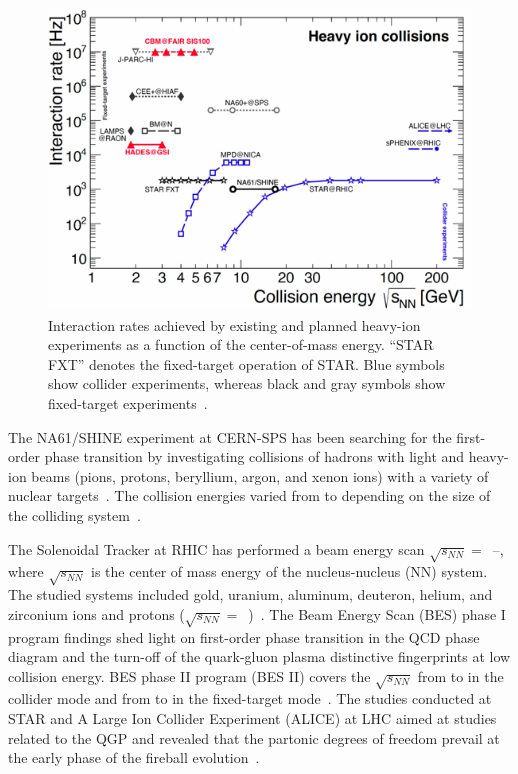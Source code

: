 \begin{figure}[!h]
    \centering
    \includegraphics[width=0.7\columnwidth]{Chapter1/images/interaction_rates.png}
    \caption{Interaction rates achieved by existing and planned heavy-ion experiments as a function of the center-of-mass energy. “STAR FXT” denotes the fixed-target operation of STAR.  Blue symbols show collider experiments, whereas black and gray symbols show fixed-target experiments~\cite{Ablyazimov_2017}.}
    \label{fig:cbm_rates}
\end{figure}

The NA61/SHINE experiment at CERN-SPS has been searching for the first-order phase transition by investigating collisions of hadrons with light and heavy-ion beams (pions, protons, beryllium, argon, and xenon ions) with a variety of nuclear targets~\cite{CBM_physics, Turko:2301677}. The collision energies varied from  to  depending on the size of the colliding system~\cite{na61energy}. 

The Solenoidal Tracker at \gls{RHIC} has
performed a beam energy scan $\sqrt{s_{NN}} =$~--, where $\sqrt{s_{NN}}$ is the center of mass energy of the nucleus-nucleus (NN) system. The studied systems included gold, uranium, aluminum, deuteron, helium, and zirconium ions and protons ($\sqrt{s_{NN}}=$~)~\cite{Stefaniak:2022dxo}. The Beam Energy Scan (\gls{BES}) phase I program findings shed light on first-order phase transition in the QCD phase diagram and the turn-off of the quark-gluon plasma distinctive fingerprints at low collision energy. BES phase II program (BES II) covers the $\sqrt{s_{NN}}$ from  to  in the collider mode and from  to  in the fixed-target mode~\cite{STAR2, STAR1}.
The studies conducted at \gls{STAR} and A Large Ion Collider Experiment (\gls{ALICE}) at \gls{LHC} aimed at studies related to the \gls{QGP} and revealed that the partonic degrees of freedom prevail at the early phase of the fireball evolution~\cite{CBM_physics}.


